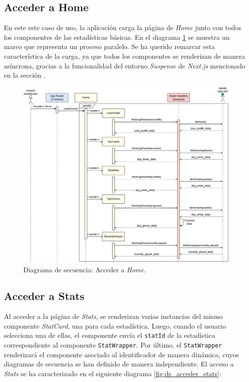 \subsection*{Acceder a Home}

En este este caso de uso, la aplicación carga la página de \textit{Home} junto con todos los componentes de las estadísticas básicas. En el diagrama \ref{fig:ds_acceder_home} se muestra un marco que representa un proceso paralelo. Se ha querido remarcar esta característica de la carga, ya que todos los componentes se renderizan de manera asíncrona, gracias a la funcionalidad del entorno \textsl{Suspense} de \textit{Next.js} mencionado en la sección .

\begin{figure}[H]
    \centering
    \includegraphics[width=\textwidth]{figures/diagramas_secuencia/ds_acceder_home.png}
    \caption{Diagrama de secuencia: Acceder a \textit{Home}.}
    \label{fig:ds_acceder_home}
\end{figure}

\subsection*{Acceder a Stats}

Al acceder a la página de \textit{Stats}, se renderizan varias instancias del mismo componente \textsl{StatCard}, una para cada estadística. Luego, cuando el usuario selecciona una de ellas, el componente envía el \texttt{statId} de la estadística correspondiente al componente \texttt{StatWrapper}. Por último, el \texttt{StatWrapper} renderizará el componente asociado al identificador de manera dinámica, cuyos diagramas de secuencia se han definido de manera independiente. El acceso a \textit{Stats} se ha caracterizado en el siguiente diagrama \ref{fig:ds_acceder_stats}:

